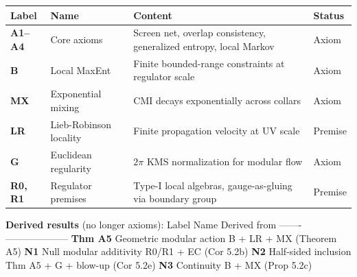 \documentclass[
]{article}
\newcounter{none} %
\begin{document}
{\def\LTcaptype{none} %
\begin{longtable}[]{@{}
  >{\raggedright\arraybackslash}p{}
  >{\raggedright\arraybackslash}p{}
  >{\raggedright\arraybackslash}p{}
  >{\raggedright\arraybackslash}p{}@{}}
\toprule\noalign{}
\begin{minipage}[b]{\linewidth}\raggedright
Label
\end{minipage} & \begin{minipage}[b]{\linewidth}\raggedright
Name
\end{minipage} & \begin{minipage}[b]{\linewidth}\raggedright
Content
\end{minipage} & \begin{minipage}[b]{\linewidth}\raggedright
Status
\end{minipage} \\
\midrule\noalign{}
\endhead
\bottomrule\noalign{}
\endlastfoot
\textbf{A1--A4} & Core axioms & Screen net, overlap consistency,
generalized entropy, local Markov & Axiom \\
\textbf{B} & Local MaxEnt & Finite bounded-range constraints at
regulator scale & Axiom \\
\textbf{MX} & Exponential mixing & CMI decays exponentially across
collars & Axiom \\
\textbf{LR} & Lieb-Robinson locality & Finite propagation velocity at UV
scale & Premise \\
\textbf{G} & Euclidean regularity & \(2\pi\) KMS normalization for
modular flow & Axiom \\
\textbf{R0, R1} & Regulator premises & Type-I local algebras,
gauge-as-gluing via boundary group & Premise \\
\end{longtable}
}

\textbf{Derived results} (no longer axioms): \textbar{} Label \textbar{}
Name \textbar{} Derived from \textbar{}
\textbar-------\textbar------\textbar--------------\textbar{} \textbar{}
\textbf{Thm A5} \textbar{} Geometric modular action \textbar{} B + LR +
MX (Theorem A5) \textbar{} \textbar{} \textbf{N1} \textbar{} Null
modular additivity \textbar{} R0/R1 + EC (Cor 5.2b) \textbar{}
\textbar{} \textbf{N2} \textbar{} Half-sided inclusion \textbar{} Thm A5
+ G + blow-up (Cor 5.2e) \textbar{} \textbar{} \textbf{N3} \textbar{}
Continuity \textbar{} B + MX (Prop 5.2c) \textbar{}
\end{document}
